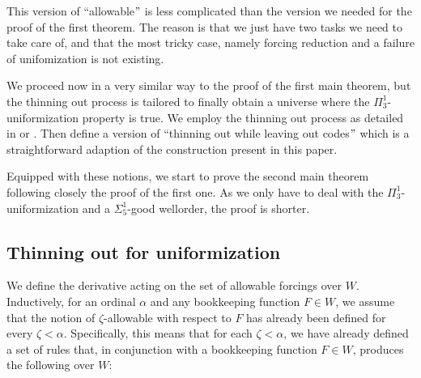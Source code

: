 \documentclass[a4paper,11pt]{article}
\begin{document}
 This version of ``allowable$"$ is less complicated than the version we needed for the proof of the first theorem. The reason is that we just have two tasks we need to take care of, and that the most tricky case, namely forcing reduction and a failure of unifomization is not existing. 

We proceed now in a very similar way to the proof of the first main theorem, but the thinning out process is tailored to finally obtain a universe where the $\Pi^1_3$-uniformization property is true. We employ the thinning out process as detailed in  \cite{Uniformization} or \cite{Uniformization with wellorder}. Then define a version of ``thinning out while leaving out codes$"$ which is a straightforward adaption of the construction present in this paper.

Equipped with these notions, we start to prove the second main theorem following closely the proof of the first one. As we only have to deal with the $\Pi^1_3$-uniformization and a $\Sigma^1_5$-good wellorder, the proof is shorter.

\subsection{Thinning out for uniformization}
We define the derivative acting on the set of allowable forcings over \( W \). Inductively, for an ordinal \( \alpha \) and any bookkeeping function \( F \in W \), we assume that the notion of \( \zeta \)-allowable with respect to \( F \) has already been defined for every \( \zeta < \alpha \). Specifically, this means that for each \( \zeta < \alpha \), we have already defined a set of rules that, in conjunction with a bookkeeping function \( F \in W \), produces the following over \( W \):
\end{document}
